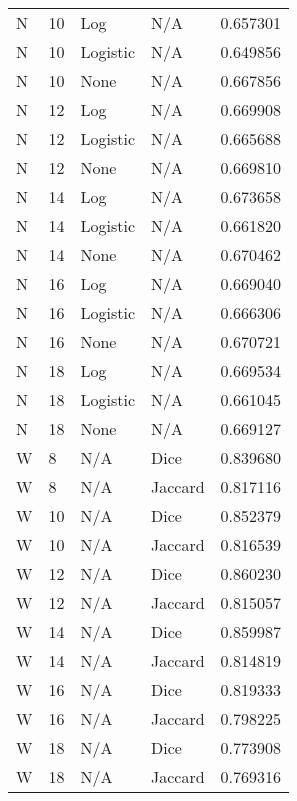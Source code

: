 \documentclass{article}
\begin{document}
\begin{center}
\begin{supertabular}{| l | l | l | l | l |}
            N & 10 & Log & N/A & 0.657301 \\
            N & 10 & Logistic & N/A & 0.649856 \\
            N & 10 & None & N/A & 0.667856 \\
            N & 12 & Log & N/A & 0.669908 \\
            N & 12 & Logistic & N/A & 0.665688 \\
            N & 12 & None & N/A & 0.669810 \\
            N & 14 & Log & N/A & 0.673658 \\
            N & 14 & Logistic & N/A & 0.661820 \\
            N & 14 & None & N/A & 0.670462 \\
            N & 16 & Log & N/A & 0.669040 \\
            N & 16 & Logistic & N/A & 0.666306 \\
            N & 16 & None & N/A & 0.670721 \\
            N & 18 & Log & N/A & 0.669534 \\
            N & 18 & Logistic & N/A & 0.661045 \\
            N & 18 & None & N/A & 0.669127 \\
            W & 8 & N/A & Dice & 0.839680 \\
            W & 8 & N/A & Jaccard & 0.817116 \\
            W & 10 & N/A & Dice & 0.852379 \\
            W & 10 & N/A & Jaccard & 0.816539 \\
            W & 12 & N/A & Dice & 0.860230 \\
            W & 12 & N/A & Jaccard & 0.815057 \\
            W & 14 & N/A & Dice & 0.859987 \\
            W & 14 & N/A & Jaccard & 0.814819 \\
            W & 16 & N/A & Dice & 0.819333 \\
            W & 16 & N/A & Jaccard & 0.798225 \\
            W & 18 & N/A & Dice & 0.773908 \\
            W & 18 & N/A & Jaccard & 0.769316 \\
      \end{supertabular}
\end{center}
\end{document}
